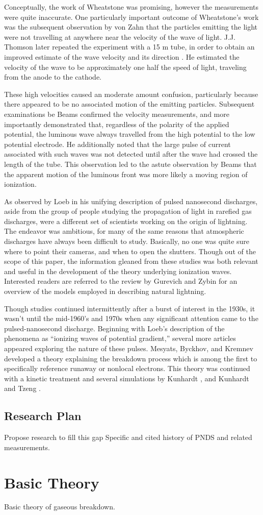 Conceptually, the work of Wheatstone was promising, however the measurements
were quite inaccurate. One particularly important outcome of Wheatstone's work
was the subsequent observation by von Zahn \cite{Zahn1879} that the particles
emitting the light were not travelling at anywhere near the velocity of the wave
of light. J.J. Thomson later repeated the experiment with a 15 m tube, in order
to obtain an improved estimate of the wave velocity and its direction
\cite{Thomson1893}. He estimated the velocity of the wave to be approximately
one half the speed of light, traveling from the anode to the cathode.

These high velocities caused an moderate amount confusion, particularly because
there appeared to be no associated motion of the emitting particles. Subsequent
examinations be Beams \cite{Beams1930} confirmed the velocity measurements, and
more importantly demonstrated that, regardless of the polarity of the applied
potential, the luminous wave always travelled from the high potential to the low
potential electrode. He additionally noted that the large pulse of current
associated with such waves was not detected until after the wave had crossed the
length of the tube. This observation led to the astute observation by Beams that
the apparent motion of the luminous front was more likely a moving region of
ionization.

As observed by Loeb \cite{Loeb1965} in his unifying description of pulsed
nanosecond discharges, aside from the group of people studying the propagation
of light in rarefied gas discharges, were a different set of scientists working
on the origin of lightning. The endeavor was ambitious, for many of the same
reasons that atmospheric discharges have always been difficult to study.
Basically, no one was quite sure where to point their cameras, and when to open
the shutters. Though out of the scope of this paper, the information gleaned
from these studies was both relevant and useful in the development of the theory
underlying ionization waves. Interested readers are referred to the review by
Gurevich and Zybin \cite{Gurevich2001} for an overview of the models employed in
describing natural lightning.

Though studies continued intermittently after a burst of interest in the 1930s,
it wasn't until the mid-1960's and 1970s when any significant attention came to
the pulsed-nanosecond discharge. Beginning with Loeb's description of the
phenomena as ``ionizing waves of potential gradient,'' several more articles
appeared exploring the nature of these pulses. Mesyats, Byckhov, and Kremnev
\cite{Mesyats1972} developed a theory explaining the breakdown process which is
among the first to specifically reference runaway or nonlocal electrons. This
theory was continued with a kinetic treatment and several simulations by
Kunhardt \cite{Kunhardt1980}, and Kunhardt and Tzeng \cite{Kunhardt1988}.



\subsection{Research Plan}

Propose research to fill this gap
Specific and cited history of PNDS and related measurements.

\section{Basic Theory}

Basic theory of gaseous breakdown.
